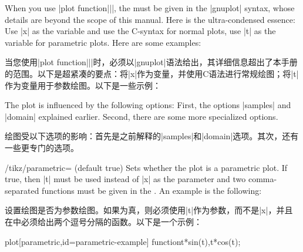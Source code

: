When you use |plot function{||}|, the  must be given in the |gnuplot| syntax, whose details are beyond the
scope of this manual. Here is the ultra-condensed essence: Use |x| as the
variable and use the C-syntax for normal plots, use |t| as the variable for
parametric plots. Here are some examples:

当您使用|plot function{||}|时，必须以|gnuplot|语法给出，其详细信息超出了本手册的范围。以下是超紧凑的要点：将|x|作为变量，并使用C语法进行常规绘图；将|t|作为变量用于参数绘图。以下是一些示例：


\begin{codeexample}[]
\end{codeexample}

The plot is influenced by the following options: First, the options |samples|
and |domain| explained earlier. Second, there are some more specialized
options.

绘图受以下选项的影响：首先是之前解释的|samples|和|domain|选项。其次，还有一些更专门的选项。

\begin{key}{/tikz/parametric= (default true)}
    Sets whether the plot is a parametric plot. If true, then |t| must be used
    instead of |x| as the parameter and two comma-separated functions must be
    given in the . An example is the following:
    

    设置绘图是否为参数绘图。如果为真，则必须使用|t|作为参数，而不是|x|，并且在中必须给出两个逗号分隔的函数。以下是一个示例：

\begin{codeexample}[]
\tikz \draw[scale=0.5,domain=-3.141:3.141,smooth]
  plot[parametric,id=parametric-example] function{t*sin(t),t*cos(t)};
\end{codeexample}
\end{key}

